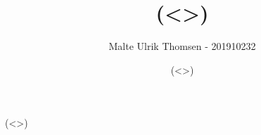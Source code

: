 \documentclass[11pt]{article}
\title{(<>)}
\author{Malte Ulrik Thomsen - 201910232}
\date{(<>)}
\begin{document}
\maketitle

(<>)
\end{document}
